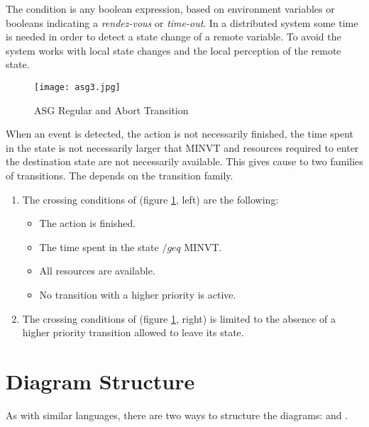 \documentclass[../main.tex]{subfiles}
\begin{document}
The condition is any boolean expression, based on environment variables or booleans indicating a \textit{rendez-vous} or \textit{time-out}.
In a distributed system some time is needed in order to detect a state change of a remote variable.
To avoid  the system works with local state changes and the local perception of the remote state.
\begin{figure}[H]
    \centering
    \texttt{[image: asg3.jpg]}
    \caption{ASG Regular and Abort Transition}
    \label{asg3}
\end{figure}
When an event is detected, the action is not necessarily finished, the time spent in the state is not necessarily larger that MINVT and resources required to enter the destination state are not necessarily available. This gives cause to two families of transitions. The  depends on the transition family.
\begin{enumerate}
	\item  The crossing conditions of  (figure \ref{asg3}, left) are the following:
	\begin{itemize}
		\item The action is finished.
		\item The time spent in the state $/geq$ MINVT.
		\item All resources are available.
		\item No transition with a higher priority is active.
	\end{itemize}
	\item The crossing conditions of  (figure \ref{asg3}, right) is limited to the absence of a higher priority transition allowed to leave its state.
\end{enumerate}

\section{Diagram Structure}
As with similar languages, there are two ways to structure the diagrams:  and .
\end{document}
